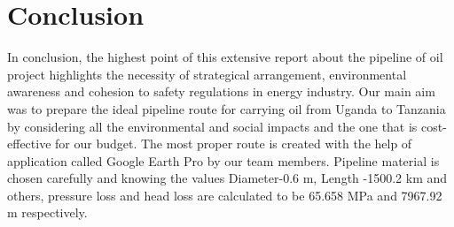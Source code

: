 \documentclass[12pt]{article}
\begin{document}
\section{Conclusion}
{\fontsize{12pt}{12pt}\selectfont
\hspace*{1em} In conclusion, the highest point of this extensive report about the pipeline of oil project highlights the necessity of strategical arrangement, environmental awareness and cohesion to safety regulations in energy industry. Our main aim was to prepare the ideal pipeline route for carrying oil from Uganda to Tanzania by considering all the environmental and social impacts and the one that is cost-effective for our budget. The most proper route is created with the help of application called Google Earth Pro by our team members. Pipeline material is chosen carefully and knowing the values Diameter-0.6 m, Length -1500.2 km and others, pressure loss and head loss are calculated to be 65.658 MPa and 7967.92 m respectively.

}
\end{document}
